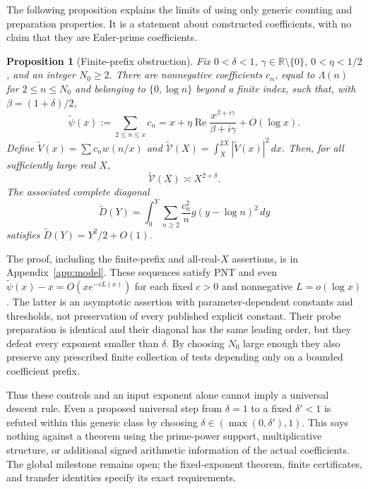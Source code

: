 \documentclass[11pt]{article}
\newtheorem{proposition}[theorem]{Proposition}
\theoremstyle{remark}
\newcommand{\dd}{\,d}
\newcommand{\R}{\mathbb R}
\newcommand{\Rea}{\operatorname{Re}}
\numberwithin{equation}{section}
\begin{document}
The following proposition explains the limits of using only generic
counting and preparation properties. It is a statement about constructed
coefficients, with no claim that they are Euler-prime coefficients.

\begin{proposition}[Finite-prefix obstruction]\label{prop:model}
Fix $0<\delta<1$, $\gamma\in\R\setminus\{0\}$, $0<\eta<1/2$, and an integer
$N_0\ge2$. There are nonnegative coefficients $c_n$, equal to
$\Lambda(n)$ for $2\le n\le N_0$ and belonging to $\{0,\log n\}$
beyond a finite index, such that, with $\beta=(1+\delta)/2$,
\begin{equation}\label{eq:model-psi}
\widetilde\psi(x):=\sum_{2\le n\le x}c_n
=x+\eta\Rea\frac{x^{\beta+i\gamma}}{\beta+i\gamma}+O(\log x).
\end{equation}
Define $\widetilde V(x)=\sum c_nw(n/x)$ and
$\widetilde{\mathcal V}(X)=\int_X^{2X}|\widetilde V(x)|^2\dd x$.
Then, for all sufficiently large real $X$,
\begin{equation}\label{eq:model-var}
\widetilde{\mathcal V}(X)\asymp X^{2+\delta}.
\end{equation}
The associated complete diagonal
\begin{equation}\label{eq:model-diagonal}
\widetilde D(Y)=\int_0^Y\sum_{n\ge2}\frac{c_n^2}{n}
g(y-\log n)^2\dd y
\end{equation}
satisfies $\widetilde D(Y)=Y^2/2+O(1)$.
\end{proposition}
The proof, including the finite-prefix and all-real-$X$ assertions, is
in Appendix~\ref{app:model}. These sequences satisfy PNT and even
$\widetilde\psi(x)-x=O(xe^{-cL(x)})$ for each fixed $c>0$ and
nonnegative $L=o(\log x)$. The latter is an asymptotic assertion with
parameter-dependent constants and thresholds, not preservation of every
published explicit constant. Their probe preparation is identical and
their diagonal has the same leading order, but they defeat every exponent
smaller than $\delta$. By choosing $N_0$ large enough they also preserve
any prescribed finite collection of tests depending only on a bounded
coefficient prefix.

Thus these controls and an input exponent alone cannot imply a universal
descent rule. Even a proposed universal step from $\delta=1$ to a fixed
$\delta'<1$ is refuted within this generic class by choosing
$\delta\in(\max(0,\delta'),1)$. This says nothing against a theorem
using the prime-power support, multiplicative structure, or additional
signed arithmetic information of the actual coefficients. The global
milestone remains open; the fixed-exponent theorem, finite certificates,
and transfer identities specify its exact requirements.
\end{document}
